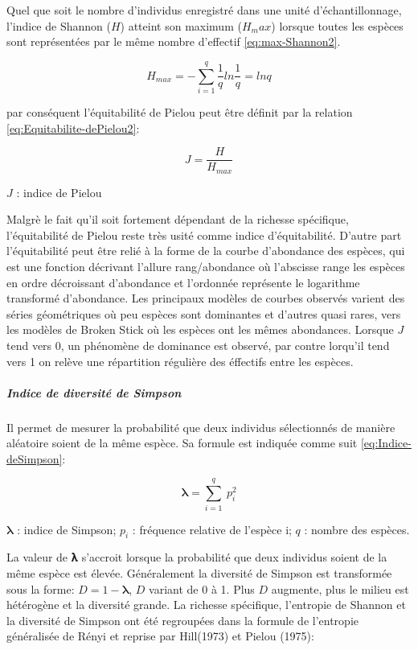 \documentclass[
  12pt,
  a4paper,
  extrafontsizes,
  onecolumn,
  openright]{book}
\theoremstyle{definition}
\theoremstyle{definition}
\theoremstyle{definition}
\theoremstyle{definition}
\theoremstyle{remark}
\begin{document}
Quel que soit le nombre d'individus enregistré dans une unité d'échantillonnage, l'indice de Shannon (\(H\)) atteint son maximum (\(H_max\)) lorsque toutes les espèces sont représentées par le même nombre d'effectif \eqref{eq:max-Shannon2}.

\begin{equation}
H_{max}=-\sum_{i=1}^q\frac{1}{q}ln\frac{1}{q}=lnq
\label{eq:max-Shannon2}
\end{equation}

par conséquent l'équitabilité de Pielou\citep{Pielou1975} peut être définit par la relation \eqref{eq:Equitabilite-dePielou2}:

\begin{equation}
J=\frac{H}{H_{max}}
\label{eq:Equitabilite-dePielou2}
\end{equation}

\(J\) : indice de Pielou

Malgrè le fait qu'il soit fortement dépendant de la richesse spécifique, l'équitabilité de Pielou reste très usité comme indice d'équitabilité. D'autre part l'équitabilité peut être relié à la forme de la courbe d'abondance des espèces, qui est une fonction décrivant l'allure rang/abondance où l'abscisse range les espèces en ordre décroissant d'abondance et l'ordonnée représente le logarithme transformé d'abondance. Les principaux modèles de courbes observés varient des séries géométriques où peu espèces sont dominantes et d'autres quasi rares, vers les modèles de Broken Stick où les espèces ont les mêmes abondances. Lorsque \(J\) tend vers 0, un phénomène de dominance est observé, par contre lorqu'il tend vers 1 on relève une répartition régulière des éffectifs entre les espèces.

\hypertarget{indice-de-diversituxe9-de-simpson}{%
\subparagraph{Indice de diversité de Simpson}\label{indice-de-diversituxe9-de-simpson}}

Il permet de mesurer la probabilité que deux individus sélectionnés de manière aléatoire soient de la même espèce. Sa formule est indiquée comme suit \eqref{eq:Indice-deSimpson}:

\begin{equation}
𝛌=\sum_{i=1}^q\ p_i^2 
\label{eq:Indice-deSimpson}
\end{equation}

\(𝛌\) : indice de Simpson;
\(p_i\) : fréquence relative de l'espèce i;
\(q\) : nombre des espèces.

La valeur de 𝛌 s'accroit lorsque la probabilité que deux individus soient de la même espèce est élevée. Généralement la diversité de Simpson est transformée sous la forme: \(D=1-𝛌\), \(D\) variant de 0 à 1. Plus \(D\) augmente, plus le milieu est hétérogène et la diversité grande. La richesse spécifique, l'entropie de Shannon et la diversité de Simpson ont été regroupées dans la formule de l'entropie généralisée de Rényi \citep{Renyi1961} et reprise par Hill(1973) et Pielou (1975):
\end{document}
